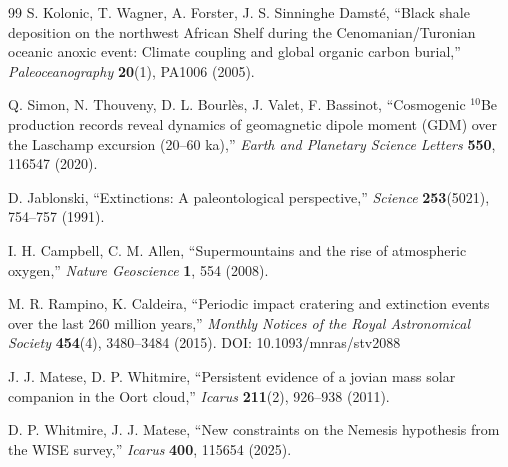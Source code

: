 \documentclass[11pt,a4paper]{article}
\begin{document}
\begin{thebibliography}{99}
		S. Kolonic, T. Wagner, A. Forster, J. S. Sinninghe Damsté, ``Black shale deposition on the northwest African Shelf during the Cenomanian/Turonian oceanic anoxic event: Climate coupling and global organic carbon burial,''
		\emph{Paleoceanography} \textbf{20}(1), PA1006 (2005).
		
		Q. Simon, N. Thouveny, D. L. Bourlès, J. Valet, F. Bassinot, ``Cosmogenic \(^{10}\)Be production records reveal dynamics of geomagnetic dipole moment (GDM) over the Laschamp excursion (20–60 ka),''
		\emph{Earth and Planetary Science Letters} \textbf{550}, 116547 (2020).
		
		D. Jablonski, ``Extinctions: A paleontological perspective,''
		\emph{Science} \textbf{253}(5021), 754–757 (1991).
		
		I. H. Campbell, C. M. Allen, ``Supermountains and the rise of atmospheric oxygen,''
		\emph{Nature Geoscience} \textbf{1}, 554 (2008).
		
		M. R. Rampino, K. Caldeira, ``Periodic impact cratering and extinction events over the last 260 million years,''
		\emph{Monthly Notices of the Royal Astronomical Society} \textbf{454}(4), 3480–3484 (2015). DOI: 10.1093/mnras/stv2088
		
		J. J. Matese, D. P. Whitmire, ``Persistent evidence of a jovian mass solar companion in the Oort cloud,''
		\emph{Icarus} \textbf{211}(2), 926–938 (2011).
		
		D. P. Whitmire, J. J. Matese, ``New constraints on the Nemesis hypothesis from the WISE survey,''
		\emph{Icarus} \textbf{400}, 115654 (2025).
		

\end{thebibliography}
\end{document}
